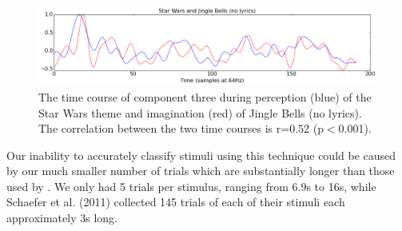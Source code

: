 \begin{figure}[t]
  \begin{center}
    \includegraphics[scale=0.4]{Figures/StarJingle}
    \caption{
The time course of component three during perception (blue) of the Star Wars theme and imagination (red) of Jingle Bells (no lyrics). The correlation between the two time courses is r=0.52 (p$<$0.001).
}
    \label{fig:starjingle}
  \end{center}
\end{figure}

Our inability to accurately classify stimuli using this technique could be caused by our much smaller number of trials which are substantially longer than those used by \cite{schaefer_name_2011}. 
We only had 5 trials per stimulus, ranging from 6.9s to 16s, while Schaefer et al. (2011) collected 145 trials of each of their stimuli each approximately 3s long.